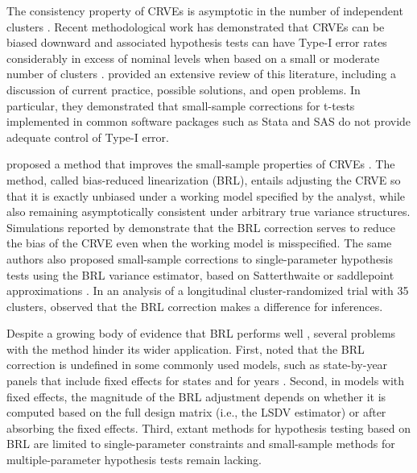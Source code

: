 \documentclass[12pt]{article}
\begin{document}
The consistency property of CRVEs is asymptotic in the number of
independent clusters \citep{Wooldridge2003cluster}. Recent
methodological work has demonstrated that CRVEs can be biased downward
and associated hypothesis tests can have Type-I error rates considerably
in excess of nominal levels when based on a small or moderate number of
clusters \citep[e.g.,][]{MacKinnon2016wild}.
\citet{Cameron2015practitioners} provided an extensive review of this
literature, including a discussion of current practice, possible
solutions, and open problems. In particular, they demonstrated that
small-sample corrections for t-tests implemented in common software
packages such as Stata and SAS do not provide adequate control of Type-I
error.

\citet{Bell2002bias} proposed a method that improves the small-sample
properties of CRVEs \citep[see also][]{McCaffrey2001generalizations}.
The method, called bias-reduced linearization (BRL), entails adjusting
the CRVE so that it is exactly unbiased under a working model specified
by the analyst, while also remaining asymptotically consistent under
arbitrary true variance structures. Simulations reported by
\citet{Bell2002bias} demonstrate that the BRL correction serves to
reduce the bias of the CRVE even when the working model is misspecified.
The same authors also proposed small-sample corrections to
single-parameter hypothesis tests using the BRL variance estimator,
based on Satterthwaite \citep{Bell2002bias} or saddlepoint
approximations \citep{McCaffrey2006improved}. In an analysis of a
longitudinal cluster-randomized trial with 35 clusters,
\citet{Angrist2009effects} observed that the BRL correction makes a
difference for inferences.

Despite a growing body of evidence that BRL performs well
\citep[e.g.,][]{Imbens2015robust}, several problems with the method
hinder its wider application. First, \citet{Angrist2009mostly} noted
that the BRL correction is undefined in some commonly used models, such
as state-by-year panels that include fixed effects for states and for
years \citep[see also][]{Young2016improved}. Second, in models with
fixed effects, the magnitude of the BRL adjustment depends on whether it
is computed based on the full design matrix (i.e., the LSDV estimator)
or after absorbing the fixed effects. Third, extant methods for
hypothesis testing based on BRL are limited to single-parameter
constraints \citep{Bell2002bias, McCaffrey2006improved} and small-sample
methods for multiple-parameter hypothesis tests remain lacking.
\end{document}
